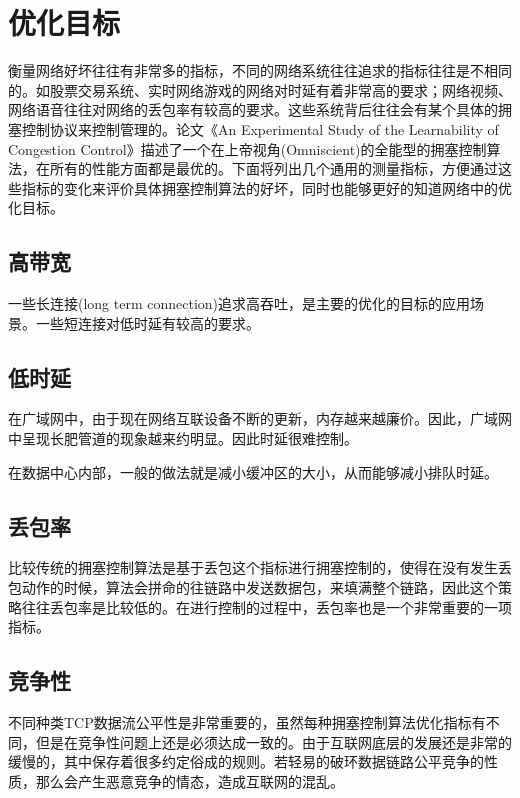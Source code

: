 \documentclass[a4paper, 12pt, UTF8]{ctexart}
\begin{document}
\clearpage

\section{优化目标}
\par 衡量网络好坏往往有非常多的指标，不同的网络系统往往追求的指标往往是不相同的。如股票交易系统、实时网络游戏的网络对时延有着非常高的要求；网络视频、网络语音往往对网络的丢包率有较高的要求。这些系统背后往往会有某个具体的拥塞控制协议来控制管理的。论文《An Experimental Study of the Learnability of Congestion Control》\cite{DBLP:conf/sigcomm/SivaramanWTB14}描述了一个在上帝视角(Omniscient)的全能型的拥塞控制算法，在所有的性能方面都是最优的。下面将列出几个通用的测量指标，方便通过这些指标的变化来评价具体拥塞控制算法的好坏，同时也能够更好的知道网络中的优化目标。


\subsection{高带宽}
\par 一些长连接(long term connection)追求高吞吐，是主要的优化的目标的应用场景。一些短连接对低时延有较高的要求。
\subsection{低时延}
\par 在广域网中，由于现在网络互联设备不断的更新，内存越来越廉价。因此，广域网中呈现长肥管道的现象越来约明显。因此时延很难控制。

\par 在数据中心内部，一般的做法就是减小缓冲区的大小，从而能够减小排队时延。

\subsection{丢包率}
\par 比较传统的拥塞控制算法是基于丢包这个指标进行拥塞控制的，使得在没有发生丢包动作的时候，算法会拼命的往链路中发送数据包，来填满整个链路，因此这个策略往往丢包率是比较低的。在进行控制的过程中，丢包率也是一个非常重要的一项指标。

\subsection{竞争性}

\par 不同种类TCP数据流\cite{DBLP:conf/imc/WareMSS19}公平性是非常重要的，虽然每种拥塞控制算法优化指标有不同，但是在竞争性问题上还是必须达成一致的。由于互联网底层的发展还是非常的缓慢的，其中保存着很多约定俗成的规则。若轻易的破环数据链路公平竞争的性质，那么会产生恶意竞争的情态，造成互联网的混乱。
\end{document}
